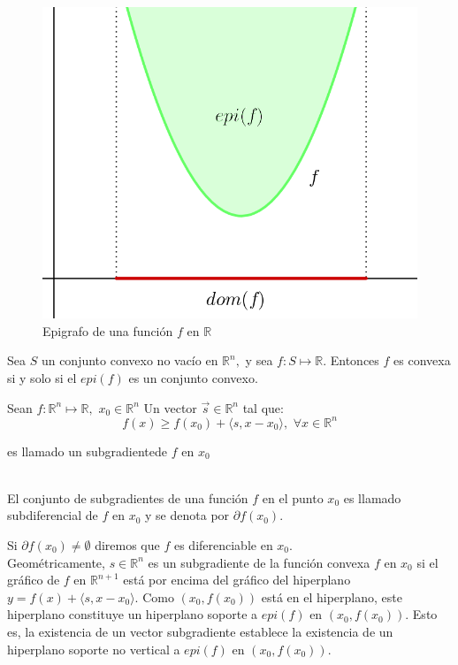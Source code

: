 \begin{figure}
   \centering
   \includegraphics{./partes/sub_sec/codigo-image/epi.png}
   \caption{Epigrafo de una funci\'on $f$ en $\mathbb{R}$ \cite{lara}}
\end{figure}

{\teorema Sea $S$ un conjunto convexo no vac\'io en $\mathbb{R}^n,$ y sea $f: S \longmapsto \mathbb{R}.$ Entonces $f$ es convexa si y solo si
el $epi(f)$ es un conjunto convexo.\label{epi-convx}} \medskip



{ Sean $f: \mathbb{R}^n \longmapsto \mathbb{R},\,\, x_0 \in \mathbb{R}^n$ Un vector $\vec{s} \in \mathbb{R}^n$ tal que:
$$f(x) \geqslant f(x_{0}) + \langle s, x - x_0 \rangle,\,\, \forall x\in \mathbb{R}^n$$

es llamado un subgradientede $f$ en $x_0$ \cite{navarro}  \label{subgradiente}}\\

El conjunto de subgradientes de una funci\'on $f$ en el punto $x_0$ es llamado subdiferencial de $f$ en $x_0$ y se denota por 
$\partial f(x_0).$
\medskip

{ Si $\partial f(x_0) \neq \emptyset$ diremos que $f$ es diferenciable en $x_0.$ \label{sub-dif}}\\


Geom\'etricamente, $s \in \mathbb{R}^n$ es un subgradiente de la funci\'on convexa $f$ en $x_0$ si el gr\'afico de $f$ en $\mathbb{R}^{n+1}$
est\'a por encima del gr\'afico del hiperplano $y = f(x) + \langle s, x - x_0 \rangle .$ Como $(x_0, f(x_0))$ est\'a en el hiperplano, este 
hiperplano constituye un hiperplano soporte a $epi(f)$ en $(x_0, f(x_0)).$ Esto es, la existencia de un vector subgradiente establece la
existencia de un hiperplano soporte no vertical a $epi(f)$ en $(x_0, f(x_0)).$

